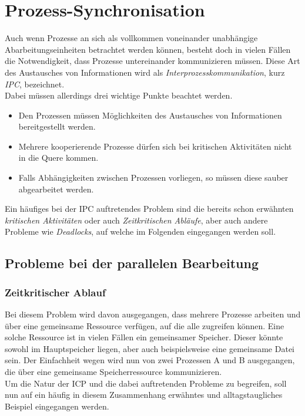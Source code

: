 	\section{Prozess-Synchronisation}
		\label{ProzessSynchronisation}
	
		Auch wenn Prozesse an sich als vollkommen voneinander unabhängige Abarbeitungseinheiten betrachtet werden können, besteht doch in vielen Fällen die Notwendigkeit, dass Prozesse untereinander kommunizieren müssen. Diese Art des Austausches von Informationen wird als \textit{Interprozesskommunikation}, kurz \textit{IPC}, bezeichnet.\\
		Dabei müssen allerdings drei wichtige Punkte beachtet werden.
		
		\begin{itemize}
			\item Den Prozessen müssen Möglichkeiten des Austausches von Informationen bereitgestellt werden.
			\item Mehrere kooperierende Prozesse dürfen sich bei kritischen Aktivitäten nicht in die Quere kommen.
			\item Falls Abhängigkeiten zwischen Prozessen vorliegen, so müssen diese sauber abgearbeitet werden.			
		\end{itemize}
	
		Ein häufiges bei der IPC auftretendes Problem sind die bereits schon erwähnten \textit{kritischen Aktivitäten} oder auch \textit{Zeitkritischen Abläufe}, aber auch andere Probleme wie \textit{Deadlocks}, auf welche im Folgenden eingegangen werden soll. \cite{ModerneBetriebssysteme}
		
		\subsection{Probleme bei der parallelen Bearbeitung}
			\label{ProblemeParalleleBearbeitung}
		
			\subsubsection{Zeitkritischer Ablauf}
				\label{ZeitkritischerAblauf}
			
				Bei diesem Problem wird davon ausgegangen, dass mehrere Prozesse arbeiten und über eine gemeinsame Ressource verfügen, auf die alle zugreifen können. Eine solche Ressource ist in vielen Fällen ein gemeinsamer Speicher. Dieser könnte sowohl im Hauptspeicher liegen, aber auch beispielsweise eine gemeinsame Datei sein. Der Einfachheit wegen wird nun von zwei Prozessen A und B ausgegangen, die über eine gemeinsame Speicherressource kommunizieren.\\
				Um die Natur der ICP und die dabei auftretenden Probleme zu begreifen, soll nun auf ein häufig in diesem Zusammenhang erwähntes und alltagstaugliches Beispiel eingegangen werden.
				
